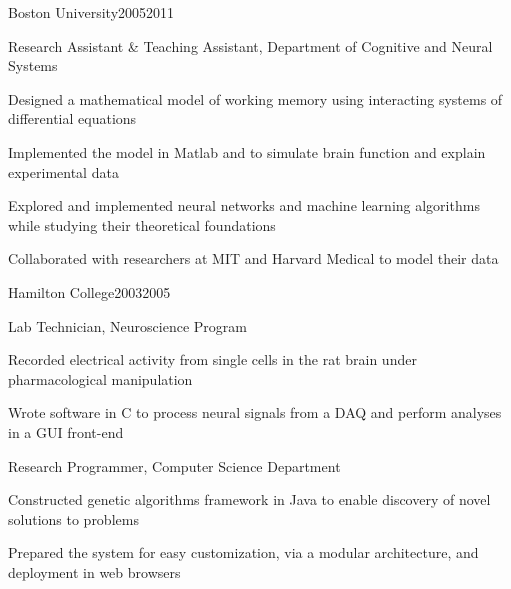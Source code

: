 \documentclass{report}
\begin{document}

  \begin{work_location}{Boston University}{2005}{2011}

    \begin{position}{Research Assistant \& Teaching Assistant, Department of Cognitive and Neural Systems}
      \item Designed a mathematical model of working memory using interacting systems of differential equations
      \item Implemented the model in Matlab and \CC{} to simulate brain function and explain experimental data
      \item Explored and implemented neural networks and machine learning algorithms while studying their theoretical foundations
      \item Collaborated with researchers at MIT and Harvard Medical to model their data
    \end{position}

  \end{work_location}



  \begin{work_location}{Hamilton College}{2003}{2005}

    \begin{position}{Lab Technician, Neuroscience Program}
      \item Recorded electrical activity from single cells in the rat brain under pharmacological manipulation
      \item Wrote software in C to process neural signals from a DAQ and perform analyses in a GUI front-end
    \end{position}

    \begin{position}{Research Programmer, Computer Science Department}
      \item Constructed genetic algorithms framework in Java to enable discovery of novel solutions to problems
      \item Prepared the system for easy customization, via a modular architecture, and deployment in web browsers
    \end{position}

  \end{work_location}






\end{document}
